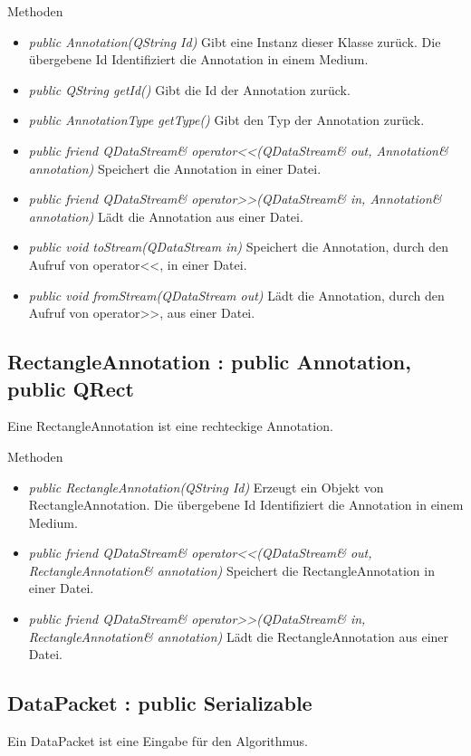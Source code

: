 Methoden
\begin{itemize}
\item \textit{public Annotation(QString Id)} Gibt eine Instanz dieser Klasse zurück. Die übergebene Id Identifiziert die Annotation in einem Medium.
\item \textit{public QString getId()} Gibt die Id der Annotation zurück.
\item \textit{public AnnotationType getType()} Gibt den Typ der Annotation zurück.
\item \textit{public friend QDataStream\& operator<<(QDataStream\& out, Annotation\& annotation)} Speichert die Annotation in einer Datei.
\item \textit{public friend QDataStream\& operator>>(QDataStream\& in, Annotation\& annotation)} Lädt die Annotation aus einer Datei.
\item \textit{public void toStream(QDataStream in)} Speichert die Annotation, durch den Aufruf von operator<<, in einer Datei.
\item \textit{public void fromStream(QDataStream out)} Lädt die Annotation, durch den Aufruf von operator>>, aus einer Datei.
\end{itemize}

\subsection*{RectangleAnnotation : public Annotation, public QRect}
Eine RectangleAnnotation ist eine rechteckige Annotation.

Methoden
\begin{itemize}
\item \textit{public RectangleAnnotation(QString Id)} Erzeugt ein Objekt von RectangleAnnotation. Die übergebene Id Identifiziert die Annotation in einem Medium.
\item \textit{public friend QDataStream\& operator<<(QDataStream\& out, RectangleAnnotation\& annotation)} Speichert die RectangleAnnotation in einer Datei.
\item \textit{public friend QDataStream\& operator>>(QDataStream\& in, RectangleAnnotation\& annotation)} Lädt die RectangleAnnotation aus einer Datei.
\end{itemize}

\subsection*{DataPacket : public Serializable}
Ein DataPacket ist eine Eingabe für den Algorithmus.

